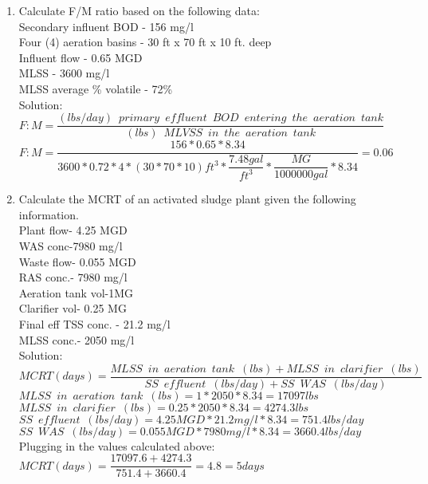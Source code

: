 \begin{enumerate}
\item Calculate F/M ratio based on the following data:\\
Secondary influent BOD - 156 mg/l\\
Four (4) aeration basins - 30 ft x 70 ft x 10 ft. deep\\
Influent flow - 0.65 MGD\\
MLSS - 3600 mg/l\\
MLSS average \% volatile - 72\%\\
Solution:\\
\vspace{0.3cm}
$F:M=\dfrac{(lbs/day) \enspace primary \enspace effluent  \enspace BOD \enspace entering \enspace the  \enspace aeration \enspace tank}{(lbs) \enspace MLVSS \enspace in \enspace the  \enspace aeration \enspace tank}$\\
\vspace{0.3cm}
$F:M=\dfrac{156*0.65*8.34}{3600*0.72*4*(30*70*10)ft^3* \dfrac{7.48gal}{ft^3}*\dfrac{MG}{1000000gal}*8.34}=\boxed{0.06}$\\

\item Calculate the MCRT of an activated sludge plant given the following information.\\
Plant flow- 4.25 MGD\\
WAS conc-7980 mg/l\\
Waste flow- 0.055 MGD\\
RAS conc.- 7980 mg/l\\
Aeration tank vol-1MG\\  
Clarifier vol- 0.25 MG\\
Final eff TSS conc. - 21.2 mg/l\\
MLSS conc.- 2050 mg/l\\
\vspace{0.3cm}
Solution:\\
\vspace{0.3cm}
$MCRT (days) =  \dfrac{MLSS \enspace in \enspace aeration \enspace tank \enspace (lbs)+MLSS \enspace in \enspace clarifier \enspace (lbs)}{SS \enspace effluent \enspace (lbs/day)+SS \enspace WAS \enspace (lbs/day)}$\\
\vspace{0.3cm} 
$MLSS \enspace in \enspace aeration \enspace tank \enspace (lbs)=1*2050*8.34=17097lbs$\\
\vspace{0.3cm} 
$MLSS \enspace in \enspace clarifier \enspace (lbs)=0.25*2050*8.34=4274.3lbs$\\
\vspace{0.3cm} 
$SS \enspace effluent \enspace (lbs/day)=4.25MGD *21.2mg/l*8.34=751.4lbs/day$\\
\vspace{0.3cm} 
$SS \enspace WAS \enspace (lbs/day)=0.055MGD *7980mg/l*8.34=3660.4lbs/day$\\
\vspace{0.3cm} 
Plugging in the values calculated above: $MCRT (days) =  \dfrac{17097.6+4274.3}{751.4+3660.4}=4.8=\boxed{5days}$\\
\vspace{0.2cm}



\end{enumerate}
